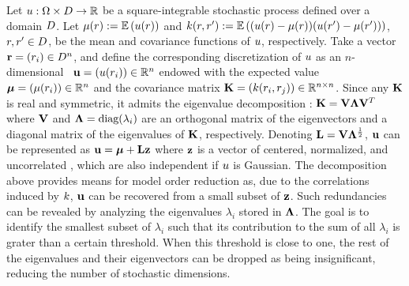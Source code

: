 Let $u: \Omega \times D \to \mathbb{R}$ be a square-integrable stochastic process defined over a domain $D$. Let $\fMean{\r} := \E{\u(\r)}$ and $\fCov{\r, \r'} := \E{(\u(\r) - \fMean{\r}) (\u(\r') - \fMean{\r'})}$, $r, r' \in D$, be the mean and covariance functions of $u$, respectively. Take a vector $\mathbf{r} = (r_i) \in D^n$, and define the corresponding discretization of $u$ as an $n$-dimensional \rv\ $\mathbf{u} = (u(r_i)) \in \mathbb{R}^n$ endowed with the expected value $\vmean = (\fMean{\r_i}) \in \real^n$ and the covariance matrix $\mCov = (\fCov{\r_i, \r_j}) \in \real^{n \times n}$. Since any $\mathbf{K}$ is real and symmetric, it admits the eigenvalue decomposition \cite{press2007}: $\mathbf{K} = \mathbf{V} \mathbf{\Lambda} \mathbf{V}^T$ where $\mathbf{V}$ and $\mathbf{\Lambda} = \text{diag}(\lambda_i)$ are an orthogonal matrix of the eigenvectors and a diagonal matrix of the eigenvalues of $\mathbf{K}$, respectively. Denoting $\mathbf{L} = \mathbf{V} \mathbf{\Lambda}^\frac{1}{2}$, $\mathbf{u}$ can be represented as $\mathbf{u} = {\boldsymbol\mu} + \mathbf{L} \mathbf{z}$ where $\mathbf{z}$ is a vector of centered, normalized, and uncorrelated \rvs, which are also independent if $u$ is Gaussian.
The decomposition above provides means for model order reduction as, due to the correlations induced by $\fCov$, $\mathbf{u}$ can be recovered from a small subset of $\mathbf{z}$. Such redundancies can be revealed by analyzing the eigenvalues $\lambda_i$ stored in $\mathbf{\Lambda}$.
The goal is to identify the smallest subset of $\lambda_i$ such that its contribution to the sum of all $\lambda_i$ is grater than a certain threshold.
When this threshold is close to one, the rest of the eigenvalues and their eigenvectors can be dropped as being insignificant, reducing the number of stochastic dimensions.
